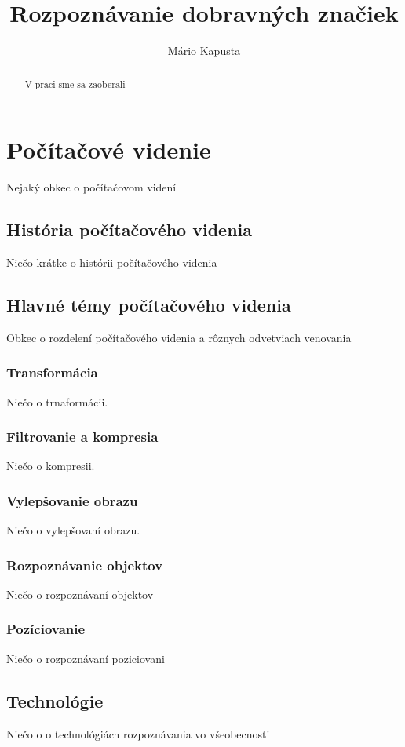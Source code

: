 \documentclass[12pt]{article}
\begin{document}
\title{Rozpoznávanie dobravných značiek}

\author{Mário Kapusta}
\maketitle
\thispagestyle{empty}
\clearpage

\begin{abstract}
V praci sme sa zaoberali
\end{abstract}
\clearpage

\section{Počítačové videnie}
Nejaký obkec o počítačovom videní
\subsection{História počítačového videnia}
Niečo krátke o histórii počítačového videnia
\subsection{Hlavné témy počítačového videnia}
Obkec o rozdelení počítačového videnia a rôznych odvetviach venovania
\subsubsection{Transformácia}
Niečo o trnaformácii.
\subsubsection{Filtrovanie a kompresia}
Niečo o kompresii.
\subsubsection{Vylepšovanie obrazu}
Niečo o vylepšovaní obrazu.
\subsubsection{Rozpoznávanie objektov}
Niečo o rozpoznávaní objektov
\subsubsection{Pozíciovanie}
Niečo o rozpoznávaní poziciovani
\subsection{Technológie}
Niečo o o technológiách rozpoznávania vo všeobecnosti
\end{document}
